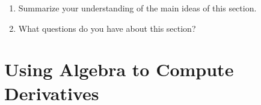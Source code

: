 \documentclass{ximera}
\begin{document}
\begin{question}  \label{Q64566y565454}
\begin{enumerate}
\item Summarize your understanding of the main ideas of this section.

\item What questions do you have about this section?
\end{enumerate}
\begin{freeResponse}
\end{freeResponse}
\end{question}


\section{Using Algebra to Compute Derivatives}
\end{document}
